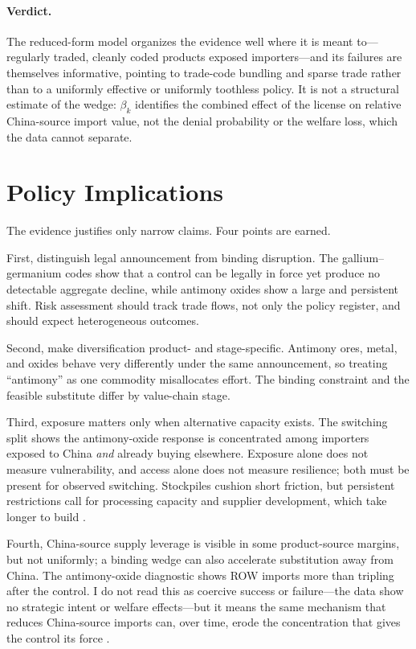 \documentclass[12pt,a4paper]{article}
\begin{document}
\paragraph{Verdict.} The reduced-form model organizes the evidence well where it
is meant to---regularly traded, cleanly coded products exposed importers---and
its failures are themselves informative, pointing to trade-code bundling and
sparse trade rather than to a uniformly effective or uniformly toothless policy.
It is not a structural estimate of the wedge: $\beta_k$ identifies the combined
effect of the license on relative China-source import value, not the denial probability or
the welfare loss, which the data cannot separate.

\section{Policy Implications}\label{sec:policy}

The evidence justifies only narrow claims. Four points are earned.

First, distinguish legal announcement from binding disruption. The
gallium--germanium codes show that a control can be legally in force yet produce
no detectable aggregate decline, while antimony oxides show a large and
persistent shift. Risk assessment should track trade flows, not only the policy
register, and should expect heterogeneous outcomes.

Second, make diversification product- and stage-specific. Antimony ores, metal,
and oxides behave very differently under the same announcement, so treating
``antimony'' as one commodity misallocates effort. The binding constraint and the
feasible substitute differ by value-chain stage.

Third, exposure matters only when alternative capacity exists. The switching
split shows the antimony-oxide response is concentrated among importers exposed
to China \emph{and} already buying elsewhere. Exposure alone does not measure
vulnerability, and access alone does not measure resilience; both must be
present for observed switching. Stockpiles cushion short friction, but persistent
restrictions call for processing capacity and supplier development, which take
longer to build \citep{vandenbrink2022antimony_resilience,
xu2025antimony_material_flow}.

Fourth, China-source supply leverage is visible in some product-source margins, but not uniformly; a binding
wedge can also accelerate substitution away from China. The antimony-oxide
diagnostic shows ROW imports more than tripling after the control. I do not read
this as coercive success or failure---the data show no strategic intent or
welfare effects---but it means the same mechanism that reduces China-source
imports can, over time, erode the concentration that gives the control its force
\citep{iea_2025_global_critical_minerals_outlook}.
\end{document}
